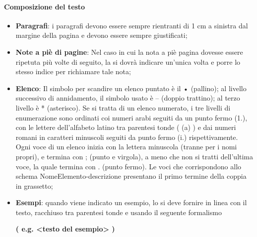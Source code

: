 			\paragraph{Composizione del testo}
				\begin{itemize}
					\item\textbf{Paragrafi}: i paragrafi devono essere sempre rientranti di 1 cm a sinistra dal margine della pagina e devono essere sempre giustificati;
					\item\textbf{Note a piè di pagine}: Nel caso in cui la nota a piè pagina dovesse essere ripetuta più volte di seguito, la si dovrà indicare un’unica volta e porre lo stesso indice per richiamare tale nota; 
					\item\textbf{Elenco}: Il simbolo per scandire un elenco puntato è il • (pallino); al livello successivo di annidamento, il simbolo usato è – (doppio trattino); al terzo livello è * (asterisco). Se si tratta di un elenco numerato, i tre livelli di enumerazione sono ordinati coi numeri arabi seguiti da un punto fermo (1.), con le lettere dell’alfabeto latino tra parentesi tonde ( (a) ) e dai numeri romani in caratteri minuscoli seguiti da punto fermo (i.) rispettivamente. Ogni voce di un elenco inizia con la lettera minuscola (tranne per i nomi propri), e termina con ; (punto e virgola), a meno che non si tratti dell’ultima voce, la quale termina con . (punto fermo). Le voci che corrispondono allo schema NomeElemento-descrizione presentano il primo termine della coppia in grassetto;
					\item\textbf{Esempi}: quando viene indicato un esempio, lo si deve fornire in linea con il testo, racchiuso tra parentesi tonde e usando il seguente formalismo
						\begin{center}
							\textbf{( e.g. <testo del esempio> )}
						\end{center}
				\end{itemize}
